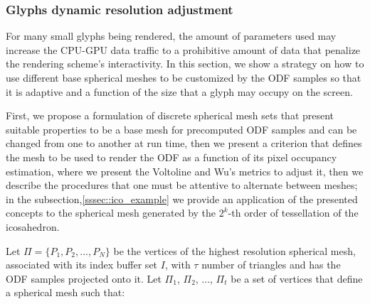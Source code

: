 \documentclass[twoside,twocolumn,10pt]{article}
\begin{document}

\subsubsection{Glyphs dynamic resolution adjustment}
\label{ssec::resolution}

For many small glyphs being rendered, the amount of parameters used may increase the CPU-GPU data traffic to a prohibitive amount of data that penalize the rendering scheme's interactivity. In this section, we show a strategy on how to use different base spherical meshes to be customized by the ODF samples so that it is adaptive and a function of the size that a glyph may occupy on the screen.

First, we propose a formulation of discrete spherical mesh sets that present suitable properties to be a base mesh for precomputed ODF samples and can be changed from one to another at run time, then we present a criterion that defines the mesh to be used to render the ODF as a function of its pixel occupancy estimation, where we present the Voltoline and Wu's \cite{voltoline2021} metrics to adjust it, then we describe the procedures that one must be attentive to alternate between meshes; in the subsection,\ref{sssec::ico_example} we provide an application of the presented concepts to the spherical mesh generated by the $2^k$-th order of tessellation of the icosahedron.


Let $\Pi = \{P_1, P_2, ..., P_{N}\}$ be the vertices of the highest resolution spherical mesh, associated with its index buffer set $I$, with $\tau$ number of triangles and has the ODF samples projected onto it. Let $\Pi_{1}$, $\Pi_{2}$, ..., $\Pi_{t}$ be a set of vertices that define a spherical mesh such that:
\end{document}
